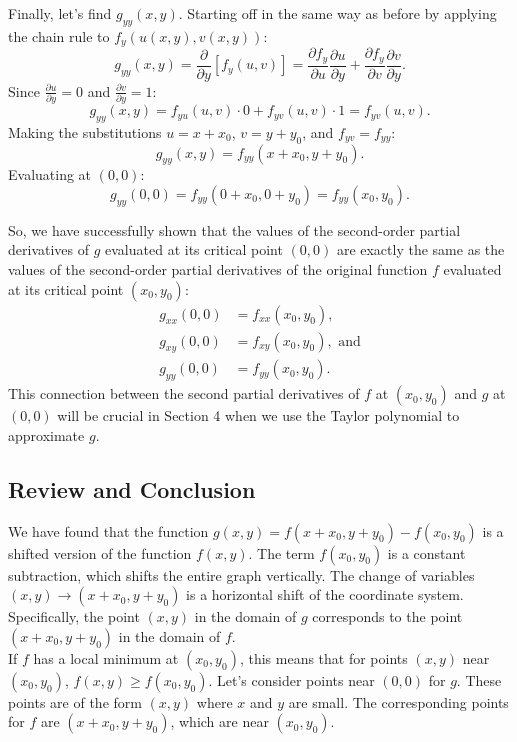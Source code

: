 \documentclass{article}
\newcommand{\mpfrac}[1]{\frac{\partial}{\partial #1}}
\newcommand{\bpfrac}[2]{\frac{\partial #1}{\partial #2}}
\begin{document}
Finally, let's find \( g_{yy}(x,y) \). Starting off in the same way as before by applying the chain rule to \( f_{y}(u(x,y), v(x,y)) \):
\[
	g_{yy}(x,y) = \mpfrac{y}[f_{y}(u,v)] = \bpfrac{f_{y}}{u} \bpfrac{u}{y} + \bpfrac{f_{y}}{v} \bpfrac{v}{y}.
\]
Since \( \bpfrac{u}{y} = 0 \) and \( \bpfrac{v}{y} = 1 \):
\[
	g_{yy}(x,y) = f_{yu}(u,v) \cdot 0 + f_{yv}(u,v) \cdot 1 = f_{yv}(u,v).
\]
Making the substitutions \( u = x + x_{0} \), \( v = y + y_{0} \), and \( f_{yv} = f_{yy} \):
\[
	g_{yy}(x,y) = f_{yy}(x + x_{0}, y + y_{0}).
\]
Evaluating at \( (0,0) \):
\[
	g_{yy}(0,0) = f_{yy}(0 + x_{0}, 0 + y_{0}) = f_{yy}(x_{0},y_{0}).
\]

So, we have successfully shown that the values of the second-order partial derivatives of \( g \) evaluated at its critical point \( (0,0) \) are exactly the same as the values of the second-order partial derivatives of the original function \( f \) evaluated at its critical point \( (x_{0},y_{0}) \):
\begin{align*}
	g_{xx}(0,0) &= f_{xx}(x_0, y_0), \\
	g_{xy}(0,0) &= f_{xy}(x_0, y_0), \text{ and}\\
	g_{yy}(0,0) &= f_{yy}(x_0, y_0).
\end{align*}
This connection between the second partial derivatives of \( f \) at \( (x_0, y_0) \) and \( g \) at \( (0,0) \) will be crucial in Section 4 when we use the Taylor polynomial to approximate \( g \).

\subsection{Review and Conclusion}

We have found that the function \( g(x,y) = f(x + x_0, y + y_0) - f(x_0, y_0) \) is a shifted version of the function \( f(x,y) \). The term \( f(x_0, y_0) \) is a constant subtraction, which shifts the entire graph vertically. The change of variables \( (x,y) \to (x+x_0, y+y_0) \) is a horizontal shift of the coordinate system. Specifically, the point \( (x,y) \) in the domain of \( g \) corresponds to the point \( (x+x_0, y+y_0) \) in the domain of \( f \). \\

If \( f \) has a local minimum at \( (x_0, y_0) \), this means that for points \( (x,y) \) near \( (x_0, y_0) \), \( f(x,y) \geq f(x_0, y_0) \). Let's consider points near \( (0,0) \) for \( g \). These points are of the form \( (x,y) \) where \( x \) and \( y \) are small. The corresponding points for \( f \) are \( (x+x_0, y+y_0) \), which are near \( (x_0, y_0) \). \\
\end{document}

